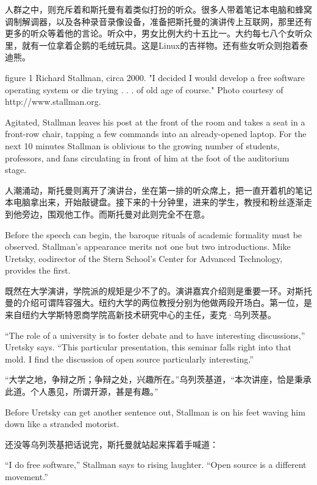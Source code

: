 \ifdefined\chs
人群之中，则充斥着和斯托曼有着类似打扮的听众。很多人带着笔记本电脑和蜂窝调制解调器，以及各种录音录像设备，准备把斯托曼的演讲传上互联网，那里还有更多的听众等着他的言论。听众中，男女比例大约十五比一。大约每七八个女听众里，就有一位拿着企鹅的毛绒玩具。这是Linux的吉祥物。还有些女听众则抱着泰迪熊。
\fi

\ifdefined\eng
figure 1
Richard Stallman, circa 2000. "I decided I would develop a free software operating system or die trying . . . of old age of course." Photo courtesy of http://www.stallman.org.
\fi

\ifdefined\eng
Agitated, Stallman leaves his post at the front of the room and takes a seat in a front-row chair, tapping a few commands into an already-opened laptop. For the next 10 minutes Stallman is oblivious to the growing number of students, professors, and fans circulating in front of him at the foot of the auditorium stage.
\fi

\ifdefined\chs
人潮涌动，斯托曼则离开了演讲台，坐在第一排的听众席上，把一直开着机的笔记本电脑拿出来，开始敲键盘。接下来的十分钟里，进来的学生，教授和粉丝逐渐走到他旁边，围观他工作。而斯托曼对此则完全不在意。
\fi

\ifdefined\eng
Before the speech can begin, the baroque rituals of academic formality must be observed. Stallman's appearance merits not one but two introductions. Mike Uretsky, codirector of the Stern School's Center for Advanced Technology, provides the first.
\fi

\ifdefined\chs
既然在大学演讲，学院派的规矩是少不了的。演讲嘉宾介绍则是重要一环。对斯托曼的介绍可谓阵容强大。纽约大学的两位教授分别为他做两段开场白。第一位，是来自纽约大学斯特恩商学院高新技术研究中心的主任，麦克·乌列茨基。
\fi

\ifdefined\eng
``The role of a university is to foster debate and to have interesting discussions,'' Uretsky says. ``This particular presentation, this seminar falls right into that mold. I find the discussion of open source particularly interesting.''
\fi

\ifdefined\chs
“大学之地，争辩之所；争辩之处，兴趣所在。”乌列茨基道，“本次讲座，恰是秉承此道。个人愚见，所谓开源，甚是有趣。”
\fi

\ifdefined\eng
Before Uretsky can get another sentence out, Stallman is on his feet waving him down like a stranded motorist.
\fi

\ifdefined\chs
还没等乌列茨基把话说完，斯托曼就站起来挥着手喊道：
\fi

\ifdefined\eng
``I do free software,'' Stallman says to rising laughter. ``Open source is a different movement.''
\fi

